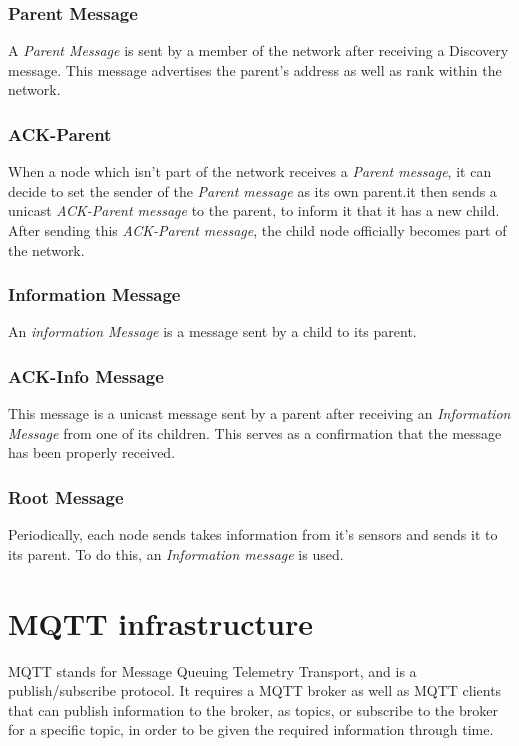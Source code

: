\documentclass[a4paper,11pt]{article}
\begin{document}
\subsubsection{Parent Message}
A \textit{Parent Message} is sent by a member of the network after receiving a Discovery message. This message advertises the parent's address as well as rank within the network.

\subsubsection{ACK-Parent}
When a node which isn't part of the network receives a \textit{Parent message}, it can decide to set the sender of the \textit{Parent message} as its own parent.it then sends a unicast \textit{ACK-Parent message} to the parent, to inform it that it has a new child. After sending this \textit{ACK-Parent message}, the child node officially becomes part of the network.

\subsubsection{Information Message}
An \textit{information Message} is a message sent by a child to its parent.

\subsubsection{ACK-Info Message}
This message is a unicast message sent by a parent after receiving an \textit{Information Message} from one of its children. This serves as a confirmation that the message has been properly received.


\subsubsection{Root Message}
Periodically, each node sends takes information from it's sensors and sends it to its parent. To do this, an \textit{Information message} is used.


\section{MQTT infrastructure}
MQTT stands for Message Queuing Telemetry Transport, and is a publish/subscribe protocol. It requires a MQTT broker as well as MQTT clients that can publish information to the broker, as topics, or subscribe to the broker for a specific topic, in order to be given the required information through time.
\end{document}
